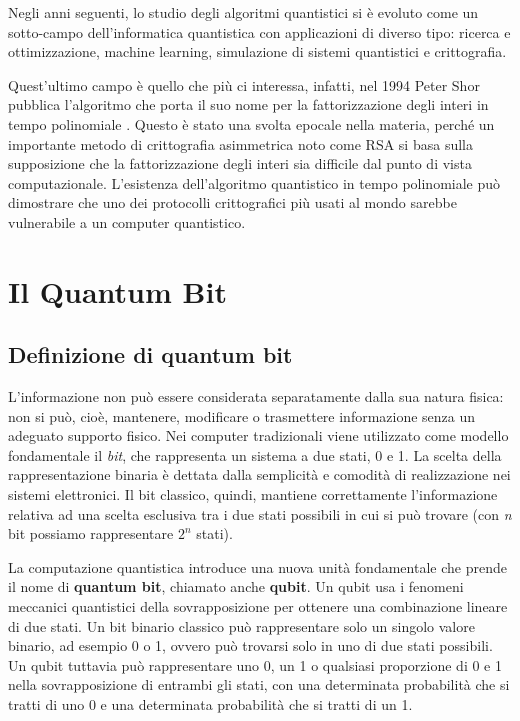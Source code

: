 Negli anni seguenti, lo studio degli algoritmi quantistici si è evoluto come un sotto-campo dell'informatica quantistica con applicazioni di diverso tipo: ricerca e ottimizzazione, machine learning, simulazione di sistemi quantistici e crittografia.

Quest'ultimo campo è quello che più ci interessa, infatti, nel 1994 Peter Shor pubblica l'algoritmo che porta il suo nome per la fattorizzazione degli interi in tempo polinomiale \cite{breaking-rsa}. Questo è stato una svolta epocale nella materia, perché un importante metodo di crittografia asimmetrica noto come RSA si basa sulla supposizione che la fattorizzazione degli interi sia difficile dal punto di vista computazionale. L'esistenza dell'algoritmo quantistico in tempo polinomiale può dimostrare che uno dei protocolli crittografici più usati al mondo sarebbe vulnerabile a un computer quantistico.

\section{Il Quantum Bit}
\subsection{Definizione di quantum bit}
L'informazione non può essere considerata separatamente dalla sua natura fisica: non si può, cioè, mantenere, modificare o trasmettere informazione senza un adeguato supporto fisico. Nei computer tradizionali viene utilizzato come modello fondamentale il \textit{bit}, che rappresenta un sistema a due stati, 0 e 1. La scelta della rappresentazione binaria è dettata dalla semplicità e comodità di realizzazione nei sistemi elettronici. Il bit classico, quindi, mantiene correttamente l'informazione relativa ad una scelta esclusiva tra i due stati possibili in cui si può trovare (con \textit{n} bit possiamo rappresentare \(2^n\) stati).

La computazione quantistica introduce una nuova unità fondamentale che prende il nome di \textbf{quantum bit}, chiamato anche \textbf{qubit}. Un qubit usa i fenomeni meccanici quantistici della sovrapposizione per ottenere una combinazione lineare di due stati. Un bit binario classico può rappresentare solo un singolo valore binario, ad esempio 0 o 1, ovvero può trovarsi solo in uno di due stati possibili. Un qubit tuttavia può rappresentare uno 0, un 1 o qualsiasi proporzione di 0 e 1 nella sovrapposizione di entrambi gli stati, con una determinata probabilità che si tratti di uno 0 e una determinata probabilità che si tratti di un 1.

